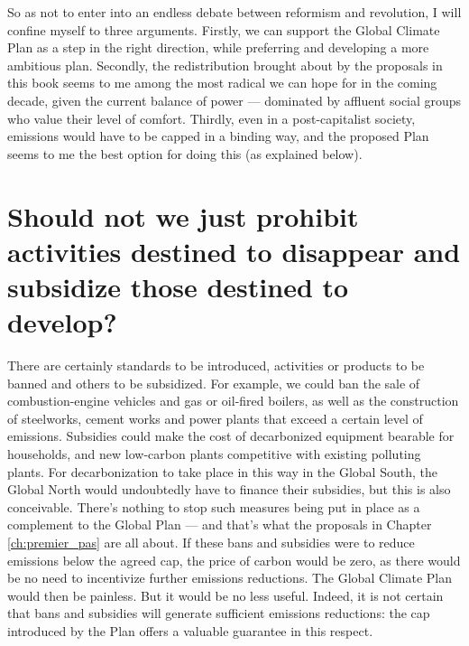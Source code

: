 \documentclass[a5paper,english,openany]{memoir}
\begin{document}
So as not to enter into an endless debate between reformism and revolution, I will confine myself to three arguments. Firstly, we can support the Global Climate Plan as a step in the right direction, while preferring and developing a more ambitious plan. Secondly, the redistribution brought about by the proposals in this book seems to me among the most radical we can hope for in the coming decade, given the current balance of power --- dominated by affluent social groups who value their level of comfort. %
Thirdly, even in a post-capitalist society, emissions would have to be capped in a binding way, and the proposed Plan seems to me the best option for doing this (as explained below). 

\section*{\normalsize Should not we just %
prohibit activities destined to disappear and subsidize those destined to develop?}\label{q:interdiction}

There are certainly standards to be introduced, activities or products to be banned and others to be subsidized. For example, we could ban the sale of combustion-engine vehicles and gas or oil-fired boilers, as well as the construction of steelworks, cement works and power plants that exceed a certain level of emissions. Subsidies could make the cost of decarbonized equipment bearable for households, and new low-carbon plants competitive with existing polluting plants. For decarbonization to take place in this way in the Global South, the Global North would undoubtedly have to finance their subsidies, but this is also conceivable. There's nothing to stop such measures being put in place as a complement to the Global Plan --- and that's what the proposals in Chapter \ref{ch:premier_pas} are all about. If these bans and subsidies were to reduce emissions below the agreed cap, the price of carbon would be zero, as there would be no need to incentivize further emissions reductions. The Global Climate Plan would then be painless. But it would be no less useful. Indeed, it is not certain that bans and subsidies will generate sufficient emissions reductions: the cap introduced by the Plan offers a valuable guarantee in this respect.
\end{document}
